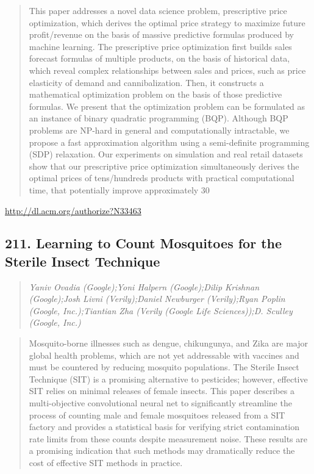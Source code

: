 \documentclass{article}
\begin{document}
\begin{quote}
This paper addresses a novel data science problem, prescriptive price optimization, which derives the optimal price strategy to maximize future profit/revenue on the basis of massive predictive formulas produced by machine learning. The prescriptive price optimization first builds sales forecast formulas of multiple products, on the basis of historical data, which reveal complex relationships between sales and prices, such as price elasticity of demand and cannibalization. Then, it constructs a mathematical optimization problem on the basis of those predictive formulas. We present that the optimization problem can be formulated as an instance of binary quadratic programming (BQP). Although BQP problems are NP-hard in general and computationally intractable, we propose a fast approximation algorithm using a semi-definite programming (SDP) relaxation. Our experiments on simulation and real retail datasets show that our prescriptive price optimization simultaneously derives the optimal prices of tens/hundreds products with practical computational time, that potentially improve approximately 30%
\end{quote}

\href{http://dl.acm.org/authorize?N33463}{http://dl.acm.org/authorize?N33463}

\subsection{211. Learning to Count Mosquitoes for the Sterile Insect Technique}

\begin{quote}
\footnotesize{\textit{Yaniv Ovadia (Google);Yoni Halpern (Google);Dilip Krishnan (Google);Josh Livni (Verily);Daniel Newburger (Verily);Ryan Poplin (Google, Inc.);Tiantian Zha (Verily (Google Life Sciences));D. Sculley (Google, Inc.)}}

\end{quote}

\begin{quote}
Mosquito-borne illnesses such as dengue, chikungunya, and Zika are major global health problems, which are not yet addressable with vaccines and must be countered by reducing mosquito populations. The Sterile Insect Technique (SIT) is a promising alternative to pesticides; however, effective SIT relies on minimal releases of female insects. This paper describes a multi-objective convolutional neural net to significantly streamline the process of counting male and female mosquitoes released from a SIT factory and provides a statistical basis for verifying strict contamination rate limits from these counts despite measurement noise. These results are a promising indication that such methods may dramatically reduce the cost of effective SIT methods in practice.
\end{quote}
\end{document}
